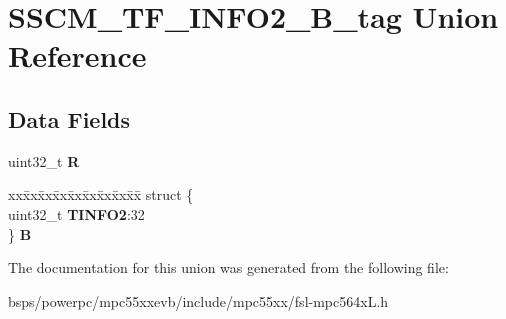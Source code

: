 \hypertarget{unionSSCM__TF__INFO2__32B__tag}{}\section{S\+S\+C\+M\+\_\+\+T\+F\+\_\+\+I\+N\+F\+O2\+\_\+B\+\_\+tag Union Reference}
\label{unionSSCM__TF__INFO2__32B__tag}
\subsection*{Data Fields}
\begin{DoxyCompactItemize}
\item 
\mbox{\label{unionSSCM__TF__INFO2__32B__tag_ae784ac7dda71d1cfdfc25835d4cb4bf2}} 
uint32\+\_\+t {\bfseries R}
\item 
\mbox{\label{unionSSCM__TF__INFO2__32B__tag_aad6ef91965dfbcf30ce07b0dde649686}} 
\begin{tabbing}
xx\=xx\=xx\=xx\=xx\=xx\=xx\=xx\=xx\=\kill
struct \{\\
\>uint32\_t {\bfseries TINFO2}:32\\
\} {\bfseries B}\\

\end{tabbing}\end{DoxyCompactItemize}


The documentation for this union was generated from the following file\+:\begin{DoxyCompactItemize}
\item 
bsps/powerpc/mpc55xxevb/include/mpc55xx/fsl-\/mpc564x\+L.\+h\end{DoxyCompactItemize}
